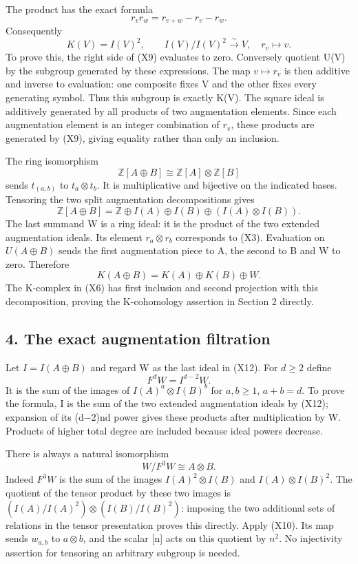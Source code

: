 \documentclass[
]{article}
\begin{document}
The product has the exact formula \[
r_vr_w=r_{v+w}-r_v-r_w.
\tag{X9}
\] Consequently \[
K(V)=I(V)^2,\qquad I(V)/I(V)^2\xrightarrow{\sim}V,
\quad r_v\longmapsto v.
\tag{X10}
\] To prove this, the right side of (X9) evaluates to zero. Conversely
quotient U(V) by the subgroup generated by these expressions. The map
\(v\mapsto r_v\) is then additive and inverse to evaluation: one
composite fixes V and the other fixes every generating symbol. Thus this
subgroup is exactly K(V). The square ideal is additively generated by
all products of two augmentation elements. Since each augmentation
element is an integer combination of \(r_v\), these products are
generated by (X9), giving equality rather than only an inclusion.

The ring isomorphism \[
\mathbb Z[A\oplus B]\cong\mathbb Z[A]\otimes\mathbb Z[B]
\tag{X11}
\] sends \(t_{(a,b)}\) to \(t_a\otimes t_b\). It is multiplicative and
bijective on the indicated bases. Tensoring the two split augmentation
decompositions gives \[
\mathbb Z[A\oplus B]=\mathbb Z\oplus I(A)\oplus I(B)\oplus(I(A)\otimes I(B)).
\tag{X12}
\] The last summand W is a ring ideal: it is the product of the two
extended augmentation ideals. Its element \(r_a\otimes r_b\) corresponds
to (X3). Evaluation on \(U(A\oplus B)\) sends the first augmentation
piece to A, the second to B and W to zero. Therefore \[
K(A\oplus B)=K(A)\oplus K(B)\oplus W.
\tag{X13}
\] The K-complex in (X6) has first inclusion and second projection with
this decomposition, proving the K-cohomology assertion in Section 2
directly.

\subsection{4. The exact augmentation
filtration}\label{the-exact-augmentation-filtration}

Let \(I=I(A\oplus B)\) and regard W as the last ideal in (X12). For
\(d\ge2\) define \[
F^dW=I^{d-2}W.
\tag{X14}
\] It is the sum of the images of \(I(A)^a\otimes I(B)^b\) for
\(a,b\ge1\), \(a+b=d\). To prove the formula, I is the sum of the two
extended augmentation ideals by (X12); expansion of its (d−2)nd power
gives these products after multiplication by W. Products of higher total
degree are included because ideal powers decrease.

There is always a natural isomorphism \[
W/F^3W\cong A\otimes B.
\tag{X15}
\] Indeed \(F^3W\) is the sum of the images \(I(A)^2\otimes I(B)\) and
\(I(A)\otimes I(B)^2\). The quotient of the tensor product by these two
images is \((I(A)/I(A)^2)\otimes(I(B)/I(B)^2)\): imposing the two
additional sets of relations in the tensor presentation proves this
directly. Apply (X10). Its map sends \(w_{a,b}\) to \(a\otimes b\), and
the scalar {[}n{]} acts on this quotient by \(n^2\). No injectivity
assertion for tensoring an arbitrary subgroup is needed.
\end{document}
